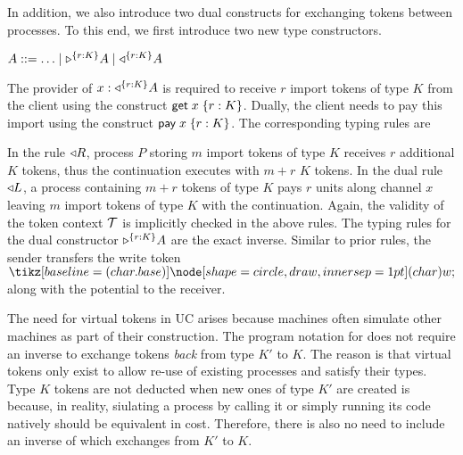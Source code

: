 In addition, we also introduce two dual constructs for exchanging tokens
between processes.
To this end, we first introduce two new type constructors.
\begin{center}
\begin{minipage}{0cm}
\begin{tabbing}
$A ::= \ldots \mid \tpaypot{A}{r : K} \mid \tgetpot{A}{r : K}$
\end{tabbing}
\end{minipage}
\end{center}
The provider of $x : \tgetpot{A}{r : K}$ is required to receive
$r$ import tokens of type $K$ from the client using the construct
$\eget{x}{r : K}$. Dually, the client needs to pay this import
using the construct $\epay{x}{r : K}$.
The corresponding typing rules are
In the rule $\getpot R$, process $P$ storing $m$ import tokens of type $K$
receives $r$ additional $K$ tokens, thus the continuation
executes with $m+r$ $K$ tokens. 
%
In the dual rule $\getpot L$, a process containing $m+r$ tokens of type $K$
pays $r$ units along channel $x$ leaving $m$ import tokens of type $K$ with
the continuation.
Again, the validity of the token context $\Tokens$ is implicitly checked
in the above rules.
The typing rules for the dual constructor $\tpaypot{A}{r : K}$
are the exact inverse.
Similar to prior rules, the sender transfers the write token $\wt$
along with the potential to the receiver.

The need for virtual tokens in UC arises because machines often simulate
other machines as part of their construction. The program notation for 
does not require an inverse to exchange tokens \textit{back} from type $K'$ to $K$.
The reason is that virtual tokens only exist to allow re-use of existing processes 
and satisfy their types. Type $K$ tokens are not deducted when new ones of type $K'$ 
are created is because, in reality, siulating a process by calling it or simply running
its code natively should be equivalent in cost. Therefore, there is also no need to 
include an inverse of  which exchanges from $K'$ to $K$.

